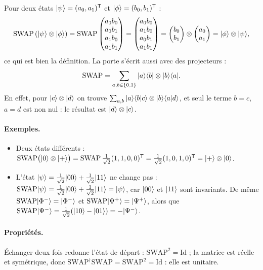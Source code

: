 Pour deux états $|\psi\rangle=(a_0,a_1)^{\mathsf T}$ et $|\phi\rangle=(b_0,b_1)^{\mathsf T}$ :
\[
  \mathrm{SWAP}\,(|\psi\rangle\otimes|\phi\rangle)
  =\mathrm{SWAP}\begin{pmatrix}a_0b_0\\a_0b_1\\a_1b_0\\a_1b_1\end{pmatrix}
  =\begin{pmatrix}a_0b_0\\a_1b_0\\a_0b_1\\a_1b_1\end{pmatrix}
  =\begin{pmatrix}b_0\\b_1\end{pmatrix}\otimes\begin{pmatrix}a_0\\a_1\end{pmatrix}
  =|\phi\rangle\otimes|\psi\rangle,
\]
ce qui est bien la définition. La porte s'écrit aussi avec des projecteurs :
\[
  \mathrm{SWAP}=\sum_{a,b\in\{0,1\}}|a\rangle\langle b|\otimes|b\rangle\langle a|.
\]
En effet, pour $|c\rangle\otimes|d\rangle$ on trouve
$\sum_{a,b}|a\rangle\langle b|c\rangle\otimes|b\rangle\langle a|d\rangle$, et seul le terme $b=c$, $a=d$
est non nul : le résultat est $|d\rangle\otimes|c\rangle$.

\paragraph{Exemples.}
\begin{itemize}[nosep]
  \item Deux états différents : $\mathrm{SWAP}\big(|0\rangle\otimes|+\rangle\big)
        =\mathrm{SWAP}\,\frac{1}{\sqrt2}(1,1,0,0)^{\mathsf T}=\frac{1}{\sqrt2}(1,0,1,0)^{\mathsf T}
        =|+\rangle\otimes|0\rangle$.
  \item L'état $|\psi\rangle=\frac{1}{\sqrt2}|00\rangle+\frac{1}{\sqrt2}|11\rangle$ ne change pas :
        $\mathrm{SWAP}|\psi\rangle=\frac{1}{\sqrt2}|00\rangle+\frac{1}{\sqrt2}|11\rangle=|\psi\rangle$,
        car $|00\rangle$ et $|11\rangle$ sont invariants. De même
        $\mathrm{SWAP}|\Phi^-\rangle=|\Phi^-\rangle$ et $\mathrm{SWAP}|\Psi^+\rangle=|\Psi^+\rangle$, alors que
        $\mathrm{SWAP}|\Psi^-\rangle=\frac{1}{\sqrt2}(|10\rangle-|01\rangle)=-|\Psi^-\rangle$.
\end{itemize}

\paragraph{Propriétés.} Échanger deux fois redonne l'état de départ :
$\mathrm{SWAP}^2=\mathrm{Id}$ ; la matrice est réelle et symétrique, donc
$\mathrm{SWAP}^\dagger\mathrm{SWAP}=\mathrm{SWAP}^2=\mathrm{Id}$ : elle est unitaire.


